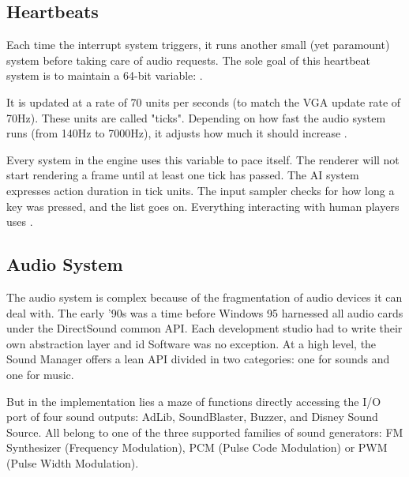 \subsection{Heartbeats}
Each time the interrupt system triggers, it runs another small (yet paramount) system before taking care of audio requests. The sole goal of this heartbeat system is to maintain a 64-bit variable: .\\
\par
\begin{minipage}{\textwidth}

\end{minipage}
\par
It is updated at a rate of 70 units per seconds (to match the VGA update rate of 70Hz). These units are called "ticks". Depending on how fast the audio system runs (from 140Hz to 7000Hz), it adjusts how much it should increase .\\
\par
Every system in the engine uses this variable to pace itself. The renderer will not start rendering a frame until at least one tick has passed. The AI system expresses action duration in tick units. The input sampler checks for how long a key was pressed, and the list goes on. Everything interacting with human players uses .\\













\subsection{Audio System}
The audio system is complex because of the fragmentation of audio devices it can deal with. The early '90s was a time before Windows 95 harnessed all audio cards under the DirectSound common API. Each development studio had to write their own abstraction layer and id Software was no exception. At a high level, the Sound Manager offers a lean API divided in two categories: one for sounds and one for music.\\
\par
\begin{minipage}{\textwidth}

\end{minipage}
\par
\begin{minipage}{\textwidth}

\end{minipage}
\par
\vspace{10pt}
But in the implementation lies a maze of functions directly accessing the I/O port of four sound outputs: AdLib, SoundBlaster, Buzzer, and Disney Sound Source. All belong to one of the three supported families of sound generators: FM Synthesizer (Frequency Modulation), PCM (Pulse Code Modulation) or PWM (Pulse Width Modulation).\\


